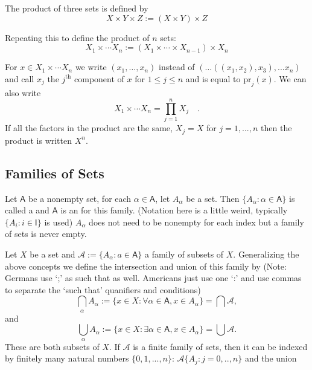 The product of three sets is defined by
$$
X \times Y \times Z := (X \times Y) \times Z
$$

Repeating this to define the product of $n$ sets:
$$
X_1 \times \cdots X_n := (X_1 \times \cdots \times X_{n-1}) \times X_n
$$

For $x \in X_1 \times \cdots X_n$ we write $(x_1,\dots,x_n)$ instead of $(\dots((x_1,x_2),x_3),...x_n)$ and call $x_j$ the $j^\text{th}$ component of $x$ for $1 \leq j \leq n$ and is equal to $\text{pr}_j(x)$. We can also write
$$
X_1 \times \cdots X_n = \prod_{j=1}^n X_j\quad.
$$
\noindent If all the factors in the product are the same, $X_j = X$ for $j = 1,...,n$ then the product is written $X^n$.

\subsection{Families of Sets}

Let $\mathsf{A}$ be a nonempty set, for each $\alpha \in \mathsf{A}$, let $A_\alpha$ be a set. Then $\{A_\alpha : \alpha \in \mathsf{A}\}$ is called a  and $\mathsf{A}$ is an  for this family. (Notation here is a little weird, typically $\{ A_i :i \in \mathsf{I}\}$ is used) $A_\alpha$ does not need to be nonempty for each index but a family of sets is never empty.

Let $X$ be a set and $\mathcal{A} := \{A_\alpha : a \in \mathsf{A}\}$ a family of subsets of $X$. Generalizing the above concepts we define the intersection and union of this family by (Note: Germans use `;' as such that as well. Americans just use one `:' and use commas to separate the `such that' quanifiers and conditions)
$$
\bigcap_\alpha A_\alpha := 
\{x \in X: \forall \alpha \in \mathsf{A}, x \in A_\alpha\}   
= \bigcap \mathcal{A},
$$
and 
$$
\bigcup_\alpha A_\alpha := \{x \in X: \exists \alpha \in \mathsf{A}, x \in A_\alpha\}
= \bigcup \mathcal{A}.
$$
These are both subsets of $X$. If $\mathcal{A}$ is a finite family of sets, then it can be indexed by finitely many natural numbers $\{0,1,...,n\}$: $\mathcal{A} \{A_j: j=0,..,n\}$ and the union

